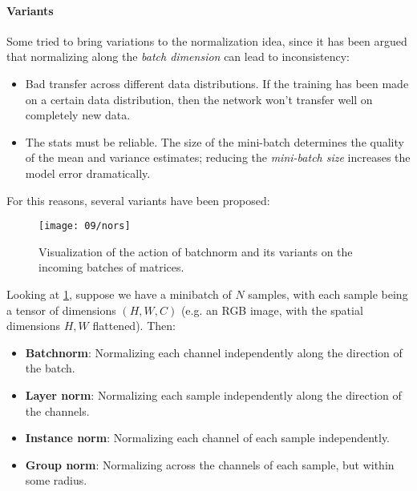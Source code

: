 \paragraph{Variants}
Some tried to bring variations to the normalization idea, since it has been argued that normalizing along the \emph{batch dimension} can lead to inconsistency:
\begin{itemize}
    \item Bad transfer across different data distributions. If the training has been made on a certain data distribution, then the network won't transfer well on completely new data. 
    \item The stats must be reliable. The size of the mini-batch determines the quality of the mean and variance estimates; reducing the \emph{mini-batch size} increases the model error dramatically.
\end{itemize}

For this reasons, several variants have been proposed:

\begin{figure}[H]
    \centering
    \texttt{[image: 09/nors]}
    \caption{Visualization of the action of batchnorm and its variants on the incoming batches of matrices.}
    \label{fig:09:3:batchnorm-visualization}
\end{figure}

Looking at \cref{fig:09:3:batchnorm-visualization}, suppose we have a minibatch of $N$ samples, with each sample being a tensor of dimensions $(H, W, C)$ (e.g. an RGB image, with the spatial dimensions $H, W$ flattened). Then:
\begin{itemize}
    \item \textbf{Batchnorm}: Normalizing each channel independently along the direction of the batch.
    \item \textbf{Layer norm}: Normalizing each sample independently along the direction of the channels.
    \item \textbf{Instance norm}: Normalizing each channel of each sample independently.
    \item \textbf{Group norm}: Normalizing across the channels of each sample, but within some radius.
\end{itemize}